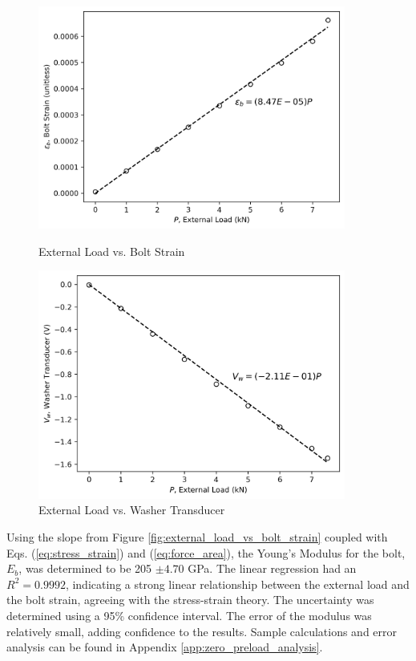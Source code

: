 \begin{figure}[h]
    \centering
    \begin{minipage}{0.50\textwidth}
        \centering
        \includegraphics[width=0.9\textwidth]{Sections/Figures/external_load_vs_bolt_strain.png}
        \caption{External Load vs. Bolt Strain}
        \label{fig:external_load_vs_bolt_strain}
    \end{minipage}\hfill
    \begin{minipage}{0.50\textwidth}
        \centering
        \includegraphics[width=0.9\textwidth]{Sections/Figures/external_load_vs_washer_transducer.png}
        \caption{External Load vs. Washer Transducer}
        \label{fig:external_load_vs_washer_transducer}
    \end{minipage}
\end{figure}

Using the slope from Figure \ref{fig:external_load_vs_bolt_strain} coupled with Eqs. (\ref{eq:stress_strain}) and (\ref{eq:force_area}), the Young's Modulus for the bolt, $E_b$, was determined to be 205 $\pm 4.70$ GPa. The linear regression had an $R^2 =  0.9992$, indicating a strong linear relationship between the external load and the bolt strain, agreeing with the stress-strain theory. The uncertainty was determined using a 95\% confidence interval. The error of the modulus was relatively small, adding confidence to the results. Sample calculations and error analysis can be found in Appendix \ref{app:zero_preload_analysis}.

